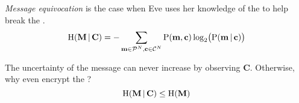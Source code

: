 \begin{definition}\label{def:Message_Equivocation}
  \emph{Message equivocation} is the case when Eve uses her knowledge of the  to help break the .
  \begin{equation}\label{eq:Message_Equivocation}
    \operatorname{\operatorname{H}}(\mathbf{M} \operatorname{\vert} \mathbf{C}) = - \sum\limits_{\mathbf{m} \in \operatorname{\mathcal{P}}^{N}, \mathbf{c} \in \operatorname{\mathcal{C}}^{N}} \operatorname{\operatorname{P}}(\mathbf{m}, \mathbf{c}) \log_{2} \bigl( \operatorname{\operatorname{P}}(\mathbf{m} \operatorname{\vert} \mathbf{c}) \bigr)
  \end{equation}

  \begin{remark}\label{def:Message_Equivocation_Upper_Bound}
    The uncertainty of the message can never increase by observing $\mathbf{C}$.
    Otherwise, why even encrypt the ?
    \begin{equation}\label{eq:Message_Equivocation_Upper_Bound}
      \operatorname{\operatorname{H}}(\mathbf{M} \operatorname{\vert} \mathbf{C}) \leq \operatorname{\operatorname{H}}(\mathbf{M})
    \end{equation}
  \end{remark}
\end{definition}

